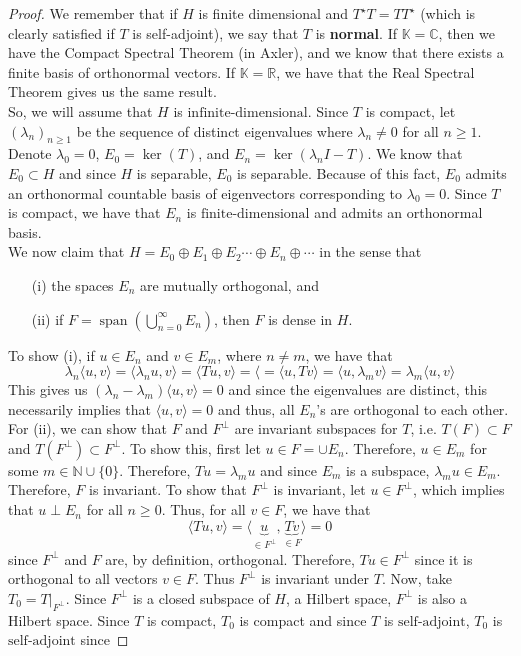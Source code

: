 \documentclass[12pt]{article}
\newcommand{\R}{{\mathbb R}}
\newcommand{\C}{{\mathbb C}}
\def\K{\mathbb{K}}
\newcommand{\N}{{\mathbb N}}
\newcommand{\fd}{{\text{finite-dimensional}}}
\newcommand{\la}{\langle}
\newcommand{\ra}{\rangle}
\DeclareMathOperator{\Span}{span}
\newcommand{\sbs}{\subset}
\newcommand{\Ts}{T^{\star}}
\newcommand{\saj}{\text{self-adjoint}}
\begin{document}
\begin{proof}
We remember that if $H$ is finite dimensional and $\Ts T = T \Ts$ (which is clearly satisfied if $T$ is self-adjoint), we say that $T$ is \textbf{normal}. If $\K = \C$, then we have the Compact Spectral Theorem (in Axler), and we know that there exists a finite basis of orthonormal vectors. If $\K = \R$, we have that the Real Spectral Theorem gives us the same result. \\
\indent So, we will assume that $H$ is in$\fd$. Since $T$ is compact, let $(\lambda_n)_{n \geq 1}$ be the sequence of distinct eigenvalues where $\lambda_n \neq 0$ for all $n \geq 1$. Denote $\lambda_0 = 0$, $E_0 = \ker(T)$, and $E_n = \ker(\lambda_n I - T)$. We know that $E_0 \sbs H$ and since $H$ is separable, $E_0$ is separable. Because of this fact, $E_0$ admits an orthonormal countable basis of eigenvectors corresponding to $\lambda_0 = 0$. Since $T$ is compact, we have that $E_n$ is $\fd$ and admits an orthonormal basis. \\
We now claim that $H = E_0 \oplus E_1 \oplus E_2 \cdots \oplus E_n \oplus \cdots$ in the sense that 
\begin{enumerate}[topsep=-15pt]
\item[(i)] the spaces $E_n$ are mutually orthogonal, and
\item[(ii)] if $F = \Span\left( \bigcup\limits_{n = 0}^{\infty} E_n \right)$, then $F$ is dense in $H$. 
\end{enumerate}
To show (i), if $u \in E_n$ and $v \in E_m$, where $n \neq m$, we have that 
\[ \lambda_n \la u, v \ra = \la \lambda_n u, v \ra = \la Tu, v \ra = \la  = \la u, Tv \ra = \la u, \lambda_m v \ra = \lambda_m \la u, v \ra\]
This gives us $(\lambda_n - \lambda_m) \la u, v \ra = 0$ and since the eigenvalues are distinct, this necessarily implies that $\la u, v \ra = 0$ and thus, all $E_n$'s are orthogonal to each other. \\
\indent For (ii), we can show that $F$ and $F^{\perp}$ are invariant subspaces for $T$, i.e. $T(F) \sbs F$ and $T(F^{\perp}) \sbs F^{\perp}$. To show this, first let $u\in F = \cup E_n$. Therefore, $u \in E_m$ for some $m \in \N \cup \{ 0\}$. Therefore, $Tu = \lambda_m u$ and since $E_m$ is a subspace, $\lambda_m u \in E_m$. Therefore, $F$ is invariant. To show that $F^{\perp}$ is invariant, let $u \in F^{\perp}$, which implies that $u \perp E_n$ for all $n \geq 0$. Thus, for all $v \in F$, we have that 
\[ \la Tu, v \ra = \la \underbrace{u}_{\in F^{\perp}}, \underbrace{Tv}_{\in F} \ra = 0\]
since $F^{\perp}$ and $F$ are, by definition, orthogonal. Therefore, $Tu \in F^{\perp}$ since it is orthogonal to all vectors $v \in F$. Thus $F^{\perp}$ is invariant under $T$. Now, take $T_0 = T \vert_{F^{\perp}}$. Since $F^{\perp}$ is a closed subspace of $H$, a Hilbert space, $F^{\perp}$ is also a Hilbert space. Since $T$ is compact, $T_0$ is compact and since $T$ is $\saj$, $T_0$ is $\saj$ since 

\end{proof}
\end{document}
